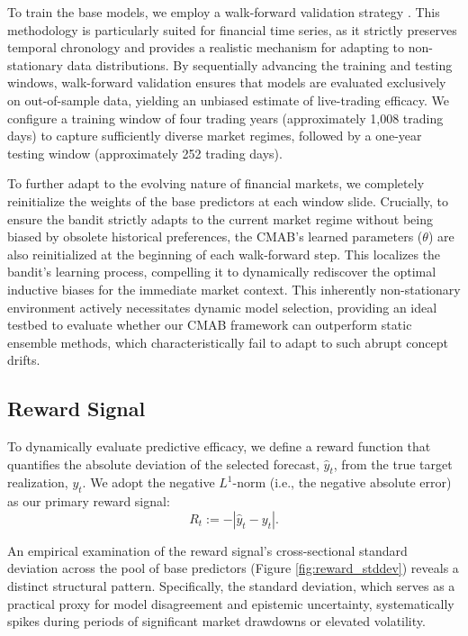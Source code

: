 \documentclass[pdflatex,sn-mathphys-num]{sn-jnl}
\theoremstyle{thmstyleone}%
\theoremstyle{thmstyletwo}%
\theoremstyle{thmstylethree}%
\begin{document}
To train the base models, we employ a walk-forward validation strategy \cite{bergmeir2018note}. This methodology is particularly suited for financial time series, as it strictly preserves temporal chronology and provides a realistic mechanism for adapting to non-stationary data distributions. By sequentially advancing the training and testing windows, walk-forward validation ensures that models are evaluated exclusively on out-of-sample data, yielding an unbiased estimate of live-trading efficacy. We configure a training window of four trading years (approximately 1,008 trading days) to capture sufficiently diverse market regimes, followed by a one-year testing window (approximately 252 trading days). 

To further adapt to the evolving nature of financial markets, we completely reinitialize the weights of the base predictors at each window slide. Crucially, to ensure the bandit strictly adapts to the current market regime without being biased by obsolete historical preferences, the CMAB's learned parameters ($\theta$) are also reinitialized at the beginning of each walk-forward step. This localizes the bandit's learning process, compelling it to dynamically rediscover the optimal inductive biases for the immediate market context. This inherently non-stationary environment actively necessitates dynamic model selection, providing an ideal testbed to evaluate whether our CMAB framework can outperform static ensemble methods, which characteristically fail to adapt to such abrupt concept drifts.

\subsection{Reward Signal}

To dynamically evaluate predictive efficacy, we define a reward function that quantifies the absolute deviation of the selected forecast, $\hat{y}_t$, from the true target realization, $y_t$. We adopt the negative $L^1$-norm (i.e., the negative absolute error) as our primary reward signal:
$$R_t := - \left\lvert \hat{y}_t - y_t \right\rvert.$$

An empirical examination of the reward signal's cross-sectional standard deviation across the pool of base predictors (Figure \ref{fig:reward_stddev}) reveals a distinct structural pattern. Specifically, the standard deviation, which serves as a practical proxy for model disagreement and epistemic uncertainty, systematically spikes during periods of significant market drawdowns or elevated volatility. 
\end{document}
